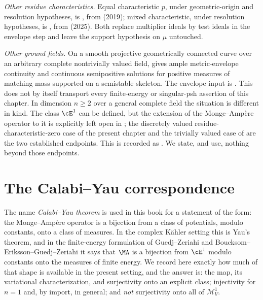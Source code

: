 \emph{Other residue characteristics.}  Equal characteristic \(p\), under
geometric-origin and resolution hypotheses, is
, from \cite{GJKM19} (2019);
mixed characteristic, under resolution hypotheses, is
, from \cite{FGK25} (2025).  Both
replace multiplier ideals by test ideals in the envelope step and leave the
support hypothesis on \(\mu\) untouched.

\emph{Other ground fields.}  On a smooth projective geometrically
connected curve over an arbitrary complete nontrivially valued field,
 gives ample metric-envelope
continuity and continuous semipositive solutions for positive measures of
matching mass supported on a semistable skeleton.  The envelope input is
\cite[Theorem~1.1]{GJKM19}.  This does not by itself transport every
finite-energy or singular-psh assertion of this chapter.
In dimension \(n\geq2\) over a
general complete field the situation is different in kind.  The class
\(\cE^1\) can be defined, but the extension of the Monge--Amp\`ere operator
to it is explicitly left open in \cite[Remark~4.4]{PS23Hybrid}; the
discretely valued residue-characteristic-zero case of the present chapter and
the trivially valued case of  are the two
established endpoints.  This is recorded as
.  We state, and use, nothing beyond those
endpoints.

\section{The Calabi--Yau correspondence}
\label{sec:ch28-calabi-yau}

The name \emph{Calabi--Yau theorem} is used in this book for a statement of
the form: the Monge--Amp\`ere operator is a bijection from a class of
potentials, modulo constants, onto a class of measures.  In the complex
K\"ahler setting this is Yau's theorem, and in the finite-energy formulation
of Guedj--Zeriahi and Boucksom--Eriksson--Guedj--Zeriahi it says that
\(\MA\) is a bijection from \(\cE^1\) modulo constants onto the measures of
finite energy.  We record here exactly how much of that shape is available in
the present setting, and the answer is: the map, its variational
characterization, and surjectivity onto an explicit class; injectivity for
\(n=1\) and, by import, in general; and \emph{not} surjectivity onto all of
\(\mathcal M^1_V\).


